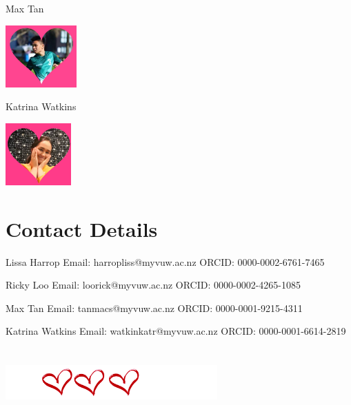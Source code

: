 \documentclass[12pt,notumble, nofoldmark]{leaflet}
\begin{document}
{Max Tan
\begin{center}
  \includegraphics[height=90px]{"../../Images/JPG/Max_image.jpg"}
\end{center} 

Katrina Watkins
\begin{center}
  \includegraphics[height=90px]{"../../Images/PNG/katrina_image2.png"}
\end{center}

\clearpage
\section{Contact Details}

Lissa Harrop \newline
Email: 
\color{blue}
harropliss@myvuw.ac.nz \newline
\color{black}
ORCID: 0000-0002-6761-7465 \newline
 
Ricky Loo \newline
Email: 
\color{blue}
loorick@myvuw.ac.nz \newline
\color{black}
ORCID: 0000-0002-4265-1085 \newline

Max Tan \newline
Email: 
\color{blue}
tanmacs@myvuw.ac.nz \newline
\color{black}
ORCID: 0000-0001-9215-4311  \newline

Katrina Watkins \newline
Email: 
\color{blue}
watkinkatr@myvuw.ac.nz\newline
\color{black}
ORCID: 0000-0001-6614-2819 \newline

\clearpage
\section{}
\begin{center}
  \includegraphics[height=50px]{"../../Images/PNG/Hearts_final.png"}
\end{center}
}
\end{document}
